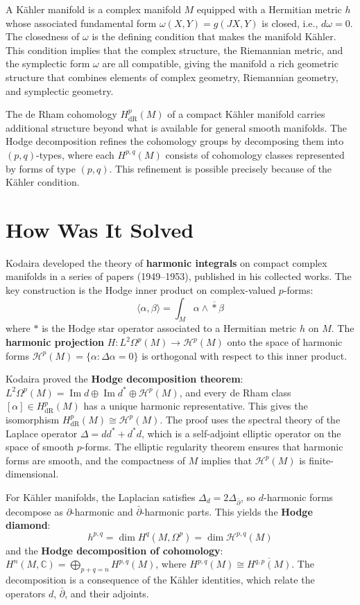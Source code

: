 A K{\"a}hler manifold is a complex manifold $M$ equipped with a
Hermitian metric $h$ whose associated fundamental form $\omega(X, Y) =
g(JX, Y)$ is closed, i.e., $d\omega = 0$. The closedness of $\omega$ is
the defining condition that makes the manifold K{\"a}hler. This
condition implies that the complex structure, the Riemannian metric, and
the symplectic form $\omega$ are all compatible, giving the manifold a
rich geometric structure that combines elements of complex geometry,
Riemannian geometry, and symplectic geometry.

The de Rham cohomology $H^p_{\text{dR}}(M)$ of a compact K{\"a}hler
manifold carries additional structure beyond what is available for
general smooth manifolds. The Hodge decomposition refines the cohomology
groups by decomposing them into $(p,q)$-types, where each $H^{p,q}(M)$
consists of cohomology classes represented by forms of type $(p,q)$.
This refinement is possible precisely because of the K{\"a}hler
condition.

\section{How Was It Solved}

Kodaira developed the theory of \textbf{harmonic integrals} on compact
complex manifolds in a series of papers (1949--1953), published in his
collected works. The key construction is the Hodge inner product on
complex-valued $p$-forms:
\[\langle \alpha, \beta \rangle = \int_M \alpha \wedge \overline{*}\beta\]
where $*$ is the Hodge star operator associated to a Hermitian metric
$h$ on $M$. The \textbf{harmonic projection} $H: L^2 \Omega^p(M) \to
\mathcal{H}^p(M)$ onto the space of harmonic forms
$\mathcal{H}^p(M) = \{\alpha : \Delta \alpha = 0\}$ is orthogonal with
respect to this inner product.

Kodaira proved the \textbf{Hodge decomposition theorem}:
$L^2 \Omega^p(M) = \operatorname{Im} d \oplus \operatorname{Im} d^*
\oplus \mathcal{H}^p(M)$, and every de Rham class $[\alpha] \in
H^p_{\text{dR}}(M)$ has a unique harmonic representative. This gives
the isomorphism $H^p_{\text{dR}}(M) \cong \mathcal{H}^p(M)$. The proof
uses the spectral theory of the Laplace operator $\Delta = d d^* + d^*
d$, which is a self-adjoint elliptic operator on the space of smooth
$p$-forms. The elliptic regularity theorem ensures that harmonic forms
are smooth, and the compactness of $M$ implies that $\mathcal{H}^p(M)$
is finite-dimensional.

For K{\"a}hler manifolds, the Laplacian satisfies $\Delta_d =
2\Delta_{\bar{\partial}}$, so $d$-harmonic forms decompose as
$\partial$-harmonic and $\bar{\partial}$-harmonic parts. This yields
the \textbf{Hodge diamond}:
\[h^{p,q} = \dim H^q(M, \Omega^p) = \dim \mathcal{H}^{p,q}(M)\]
and the \textbf{Hodge decomposition of cohomology}: $H^n(M,
\mathbb{C}) = \bigoplus_{p+q=n} H^{p,q}(M)$, where $H^{p,q}(M)
\cong \overline{H^{q,p}(M)}$. The decomposition is a consequence of the
K{\"a}hler identities, which relate the operators $d$, $\bar{\partial}$,
and their adjoints.

